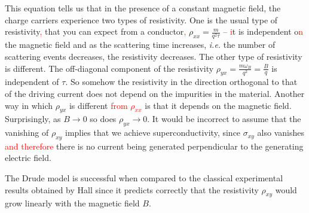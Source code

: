          This equation tells us that in the presence of a constant magnetic field, the charge carriers experience two types of resistivity. One is the usual type of resistivity\textcolor{red}{,} that you can expect from a conductor\textcolor{red}{,} $\rho_{xx} = \frac{m}{q^2\tau}$ -- \textcolor{red}{i}t is independent o\textcolor{red}{n} the magnetic field and as the scattering time increases, \textit{i.e.} the number of scattering events decreases, the resistivity decreases. The other type of resistivity is different. The off-diagonal component of the resistivity $\rho_{yx} = \frac{m \omega_B}{q^2}= \frac{B}{q}$ is independent of $\tau$. So somehow the resistivity in the direction orthogonal to that of the driving current does not depend on the impurities in the material. Another way in which $\rho_{yx}$ is different \textcolor{red}{from $\rho_{xx}$} is that it depends on the magnetic field. Surprisingly, as $B\rightarrow 0$ so does $\rho_{yx} \rightarrow 0$. It would be incorrect to assume that the vanishing of $\rho_{xy}$ implies that we achieve superconductivity, since $\sigma_{xy}$ also vanishes \textcolor{red}{and therefore} there is no current being generated perpendicular to the generating electric field.

        The Drude model is successful when compared to the classical experimental results obtained by Hall since it predicts correctly that the resistivity  $\rho_{xy}$ would grow linearly with the magnetic field $B$.
